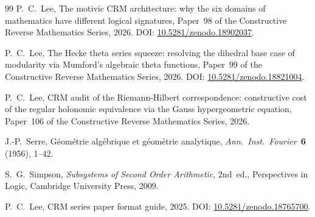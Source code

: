 \documentclass[11pt,a4paper]{article}
\theoremstyle{plain}
\theoremstyle{definition}
\begin{document}
\begin{thebibliography}{99}
P.~C.~Lee,
The motivic CRM architecture: why the six domains of mathematics have different logical signatures,
Paper~98 of the Constructive Reverse Mathematics Series,
2026.
DOI: \href{https://doi.org/10.5281/zenodo.18902037}{10.5281/zenodo.18902037}.

P.~C.~Lee,
The Hecke theta series squeeze: resolving the dihedral base case of modularity via Mumford's algebraic theta functions,
Paper~99 of the Constructive Reverse Mathematics Series,
2026.
DOI: \href{https://doi.org/10.5281/zenodo.18821004}{10.5281/zenodo.18821004}.

P.~C.~Lee,
CRM audit of the Riemann-Hilbert correspondence: constructive cost of the regular holonomic equivalence via the Gauss hypergeometric equation,
Paper~106 of the Constructive Reverse Mathematics Series,
2026.

J.-P.~Serre,
Géométrie algébrique et géométrie analytique,
\textit{Ann.\ Inst.\ Fourier}~\textbf{6} (1956), 1--42.

S.~G.~Simpson,
\textit{Subsystems of Second Order Arithmetic},
2nd~ed., Perspectives in Logic, Cambridge University Press, 2009.

P.~C.~Lee,
CRM series paper format guide,
2025.
DOI: \href{https://doi.org/10.5281/zenodo.18765700}{10.5281/zenodo.18765700}.

\end{thebibliography}
\end{document}
